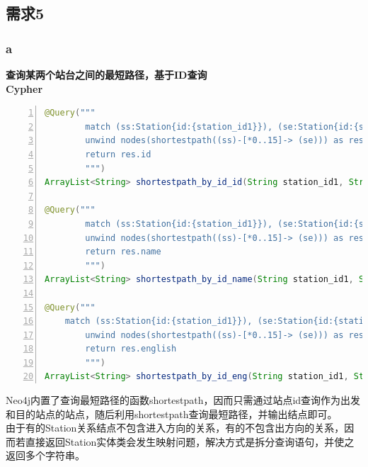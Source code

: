 \documentclass[11pt,a4paper]{article}
\begin{document}
\subsection{需求5}
\subsubsection{a}
\textbf{查询某两个站台之间的最短路径，基于ID查询} \\
\textbf{Cypher} \\
\begin{lstlisting}[numbers = left, 
showstringspaces=false,
showspaces = false,
breaklines = true, 
language=Java]
@Query("""
        match (ss:Station{id:{station_id1}}), (se:Station{id:{station_id2}})
        unwind nodes(shortestpath((ss)-[*0..15]-> (se))) as res
        return res.id
    	""")
ArrayList<String> shortestpath_by_id_id(String station_id1, String station_id2);

@Query("""
        match (ss:Station{id:{station_id1}}), (se:Station{id:{station_id2}})
        unwind nodes(shortestpath((ss)-[*0..15]-> (se))) as res
        return res.name
        """)
ArrayList<String> shortestpath_by_id_name(String station_id1, String station_id2);

@Query("""
	match (ss:Station{id:{station_id1}}), (se:Station{id:{station_id2}})
        unwind nodes(shortestpath((ss)-[*0..15]-> (se))) as res
        return res.english
    	""")
ArrayList<String> shortestpath_by_id_eng(String station_id1, String station_id2);
\end{lstlisting} 
Neo4j内置了查询最短路径的函数shortestpath，因而只需通过站点id查询作为出发和目的站点的站点，随后利用shortestpath查询最短路径，并输出结点即可。 \\
由于有的Station关系结点不包含进入方向的关系，有的不包含出方向的关系，因而若直接返回Station实体类会发生映射问题，解决方式是拆分查询语句，并使之返回多个字符串。
\end{document}
